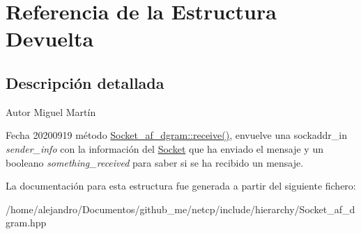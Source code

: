 \hypertarget{structDevuelta}{}\section{Referencia de la Estructura Devuelta}
\label{structDevuelta}


\subsection{Descripción detallada}
\begin{DoxyAuthor}{Autor}
Miguel Martín 
\end{DoxyAuthor}
\begin{DoxyDate}{Fecha}
20200919 método \hyperlink{classSocket__af__dgram_ac7d122d2317d980c48964076c3c7e2bb}{Socket\+\_\+af\+\_\+dgram\+::receive()}, envuelve una sockaddr\+\_\+in {\itshape sender\+\_\+info} con la información del \hyperlink{classSocket}{Socket} que ha enviado el mensaje y un booleano {\itshape something\+\_\+received} para saber si se ha recibido un mensaje. 
\end{DoxyDate}


La documentación para esta estructura fue generada a partir del siguiente fichero\+:\begin{DoxyCompactItemize}
\item 
/home/alejandro/\+Documentos/github\+\_\+me/netcp/include/hierarchy/Socket\+\_\+af\+\_\+dgram.\+hpp\end{DoxyCompactItemize}
